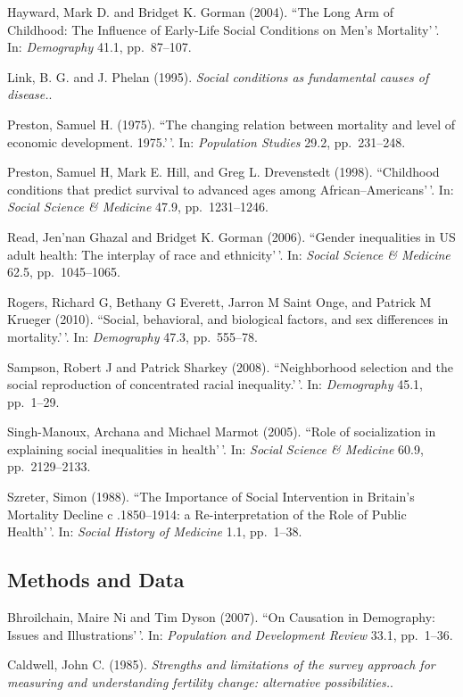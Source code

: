 \documentclass[11pt,]{article}
\begin{document}
Hayward, Mark D. and Bridget K. Gorman (2004). ``The Long Arm of
Childhood: The Influence of Early-Life Social Conditions on Men's
Mortality'\,'. In: \emph{Demography} 41.1, pp.~87--107.

Link, B. G. and J. Phelan (1995).
\emph{Social conditions as fundamental causes of disease.}.

Preston, Samuel H. (1975). ``The changing relation between mortality and
level of economic development. 1975.'\,'. In: \emph{Population Studies}
29.2, pp.~231--248.

Preston, Samuel H, Mark E. Hill, and Greg L. Drevenstedt (1998).
``Childhood conditions that predict survival to advanced ages among
African--Americans'\,'. In: \emph{Social Science \& Medicine} 47.9,
pp.~1231--1246.

Read, Jen'nan Ghazal and Bridget K. Gorman (2006). ``Gender inequalities
in US adult health: The interplay of race and ethnicity'\,'. In:
\emph{Social Science \& Medicine} 62.5, pp.~1045--1065.

Rogers, Richard G, Bethany G Everett, Jarron M Saint Onge, and Patrick M
Krueger (2010). ``Social, behavioral, and biological factors, and sex
differences in mortality.'\,'. In: \emph{Demography} 47.3, pp.~555--78.

Sampson, Robert J and Patrick Sharkey (2008). ``Neighborhood selection
and the social reproduction of concentrated racial inequality.'\,'. In:
\emph{Demography} 45.1, pp.~1--29.

Singh-Manoux, Archana and Michael Marmot (2005). ``Role of socialization
in explaining social inequalities in health'\,'. In:
\emph{Social Science \& Medicine} 60.9, pp.~2129--2133.

Szreter, Simon (1988). ``The Importance of Social Intervention in
Britain's Mortality Decline c .1850--1914: a Re-interpretation of the
Role of Public Health'\,'. In: \emph{Social History of Medicine} 1.1,
pp.~1--38.

\hypertarget{methods-and-data}{%
\subsection{Methods and Data}\label{methods-and-data}}

Bhroilchain, Maire Ni and Tim Dyson (2007). ``On Causation in
Demography: Issues and Illustrations'\,'. In:
\emph{Population and Development Review} 33.1, pp.~1--36.

Caldwell, John C. (1985).
\emph{Strengths and limitations of the survey approach for measuring and understanding fertility change: alternative possibilities.}.
\end{document}

